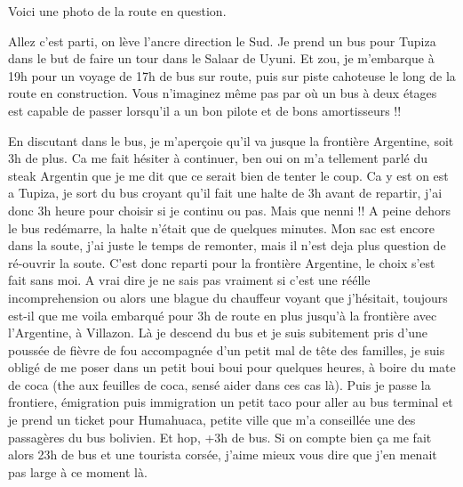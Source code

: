 \begin{multicols}{2}

Voici une photo de la route en question.


Allez c'est parti, on lève l'ancre direction le Sud. Je prend un bus pour Tupiza dans le but de faire un tour dans le Salaar de Uyuni. Et zou, je m'embarque à 19h pour un voyage de 17h de bus sur route, puis sur piste cahoteuse le long de la route en construction. Vous n'imaginez même pas par où un bus à deux étages est capable de passer lorsqu'il a un bon pilote et de bons amortisseurs !!



En discutant dans le bus, je m'aperçoie qu'il va jusque la frontière Argentine, soit 3h de plus. Ca me fait hésiter à continuer, ben oui on m'a tellement parlé du steak Argentin que je me dit que ce serait bien de tenter le coup. Ca y est on est a Tupiza, je sort du bus croyant qu'il fait une halte de 3h avant de repartir, j'ai donc 3h heure pour choisir si je continu ou pas. Mais que nenni !! A peine dehors le bus redémarre, la halte n'était que de quelques minutes. Mon sac est encore dans la soute, j'ai juste le temps de remonter, mais il n'est deja plus question de ré-ouvrir la soute. C'est donc reparti pour la frontière Argentine, le choix s'est fait sans moi. A vrai dire je ne sais pas vraiment si c'est une réélle incomprehension ou alors une blague du chauffeur voyant que j'hésitait, toujours est-il que me voila embarqué pour 3h de route en plus jusqu'à la frontière avec l'Argentine, à Villazon. Là je descend du bus et je suis subitement pris d'une poussée de fièvre de fou accompagnée d'un petit mal de tête des familles, je suis obligé de me poser dans un petit boui boui pour quelques heures, à boire du mate de coca (the aux feuilles de coca, sensé aider dans ces cas là). Puis je passe la frontiere, émigration puis immigration un petit taco pour aller au bus terminal et je prend un ticket pour Humahuaca, petite ville que m'a conseillée une des passagères du bus bolivien. Et hop, +3h de bus. Si on compte bien ça me fait alors 23h de bus et une tourista corsée, j'aime mieux vous dire que j'en menait pas large à ce moment là.


\end{multicols}
